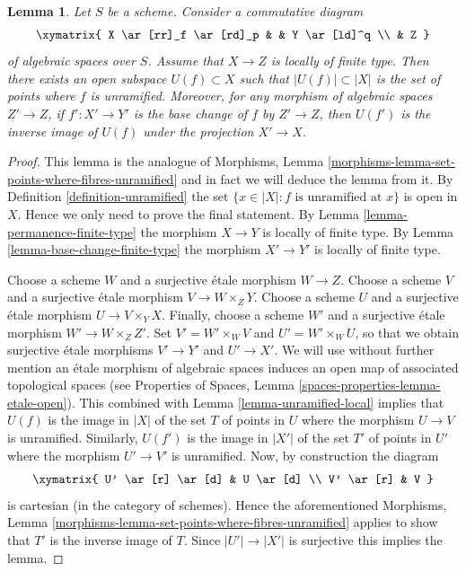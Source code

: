 \documentclass{stacks-project}
\theoremstyle{plain}
\newtheorem{lemma}[subsection]{Lemma}
\theoremstyle{definition}
\theoremstyle{remark}
\numberwithin{equation}{subsection}
\begin{document}
\begin{lemma}
\label{lemma-where-unramified}
Let $S$ be a scheme. Consider a commutative diagram
$$
\xymatrix{
X \ar[rr]_f \ar[rd]_p & & Y \ar[ld]^q \\
& Z
}
$$
of algebraic spaces over $S$. Assume that $X \to Z$ is locally of
finite type. Then there exists an open subspace $U(f) \subset X$
such that $|U(f)| \subset |X|$ is the set of points where $f$ is unramified.
Moreover, for any morphism of algebraic spaces $Z' \to Z$, if
$f' : X' \to Y'$ is the base change of $f$ by $Z' \to Z$, then
$U(f')$ is the inverse image of $U(f)$ under the projection $X' \to X$.
\end{lemma}

\begin{proof}
This lemma is the analogue of
Morphisms, Lemma \ref{morphisms-lemma-set-points-where-fibres-unramified}
and in fact we will deduce the lemma from it. By
Definition \ref{definition-unramified}
the set $\{x \in |X| : f \text{ is unramified at }x\}$ is
open in $X$. Hence we only need to prove the final statement. By
Lemma \ref{lemma-permanence-finite-type}
the morphism $X \to Y$ is locally of finite type. By
Lemma \ref{lemma-base-change-finite-type}
the morphism $X' \to Y'$ is locally of finite type.

\medskip\noindent
Choose a scheme $W$ and a surjective \'etale morphism $W \to Z$.
Choose a scheme $V$ and a surjective \'etale morphism $V \to W \times_Z Y$.
Choose a scheme $U$ and a surjective \'etale morphism $U \to V \times_Y X$.
Finally, choose a scheme $W'$ and a surjective \'etale morphism
$W' \to W \times_Z Z'$.
Set $V' = W' \times_W V$ and $U' = W' \times_W U$, so that we obtain
surjective \'etale morphisms $V' \to Y'$ and $U' \to X'$.
We will use without further mention an \'etale morphism of algebraic spaces
induces an open map of associated topological spaces (see
Properties of Spaces, Lemma
\ref{spaces-properties-lemma-etale-open}).
This combined with
Lemma \ref{lemma-unramified-local}
implies that $U(f)$ is the image in $|X|$ of the set $T$ of points in $U$
where the morphism $U \to V$ is unramified. Similarly, $U(f')$ is the image
in $|X'|$ of the set $T'$ of points in $U'$ where the morphism $U' \to V'$
is unramified. Now, by construction the diagram
$$
\xymatrix{
U' \ar[r] \ar[d] & U \ar[d] \\
V' \ar[r] & V
}
$$
is cartesian (in the category of schemes). Hence the aforementioned
Morphisms, Lemma \ref{morphisms-lemma-set-points-where-fibres-unramified}
applies to show that $T'$ is the inverse image of $T$. Since
$|U'| \to |X'|$ is surjective this implies the lemma.
\end{proof}
\end{document}

